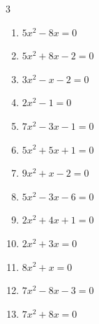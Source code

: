 \begin{multicols}{3}
\begin{enumerate}
  \item $5x^{2}-8x=0$


  \item $5x^{2}+8x-2=0$


\columnbreak %

  \item $3x^{2}-x-2=0$


  \item $2x^{2}-1=0$


  \item $7x^{2}-3x-1=0$


  \item $5x^{2}+5x+1=0$


  \item $9x^{2}+x-2=0$


  \item $5x^{2}-3x-6=0$


  \item $2x^{2}+4x+1=0$


\columnbreak %

  \item $2x^{2}+3x=0$


  \item $8x^{2}+x=0$


  \item $7x^{2}-8x-3=0$


  \item $7x^{2}+8x=0$


\end{enumerate}
\end{multicols}

